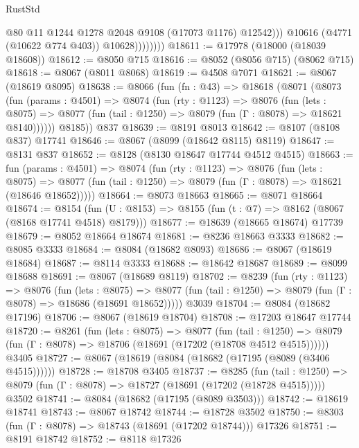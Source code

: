 \begin{lexlean}{RustStd}
\begin{coremodule}
                          @80
                          @11
                          @1244
                          @1278
                          @2048
                          @9108
                          (@17073 @1176)
                          @12542)))
                    @10616
                    (@4771 (@10622 @774 @403))
                    @10628))))))))
@18611 := @17978 (@18000 (@18039 @18608))
@18612 := @8050 @715
@18616 := @8052 (@8056 @715) (@8062 @715)
@18618 := @8067 (@8011 @8068)
@18619 := @4508 @7071
@18621 := @8067 (@18619 @8095)
@18638 := @8066
    (fun (fn : @43) =>
    @18618
      (@8071
        (@8073
          (fun (params : @4501) =>
          @8074
            (fun (rty : @1123) =>
            @8076
              (fun (lets : @8075) =>
              @8077 (fun (tail : @1250) => @8079 (fun (Γ : @8078) => @18621 @8140))))))
        @8185))
    @837
@18639 := @8191 @8013
@18642 := @8107 (@8108 @837) @17741
@18646 := @8067 (@8099 (@18642 @8115) @8119)
@18647 := @8131 @837
@18652 := @8128 (@8130 @18647 @17744 @4512 @4515)
@18663 := fun (params : @4501) =>
  @8074
    (fun (rty : @1123) =>
    @8076
      (fun (lets : @8075) =>
      @8077 (fun (tail : @1250) => @8079 (fun (Γ : @8078) => @18621 (@18646 @18652)))))
@18664 := @8073 @18663
@18665 := @8071 @18664
@18674 := @8154
    (fun (U : @8153) => @8155 (fun (t : @7) => @8162 (@8067 (@8168 @17741 @4518) @8179)))
@18677 := @18639 (@18665 @18674) @17739
@18679 := @8052 @18664 @18674
@18681 := @8236 @18663 @3333
@18682 := @8085 @3333
@18684 := @8084 (@18682 @8093)
@18686 := @8067 (@18619 @18684)
@18687 := @8114 @3333
@18688 := @18642 @18687
@18689 := @8099 @18688
@18691 := @8067 (@18689 @8119)
@18702 := @8239
    (fun (rty : @1123) =>
    @8076
      (fun (lets : @8075) =>
      @8077 (fun (tail : @1250) => @8079 (fun (Γ : @8078) => @18686 (@18691 @18652)))))
    @3039
@18704 := @8084 (@18682 @17196)
@18706 := @8067 (@18619 @18704)
@18708 := @17203 @18647 @17744
@18720 := @8261
    (fun (lets : @8075) =>
    @8077
      (fun (tail : @1250) =>
      @8079 (fun (Γ : @8078) => @18706 (@18691 (@17202 (@18708 @4512 @4515))))))
    @3405
@18727 := @8067 (@18619 (@8084 (@18682 (@17195 (@8089 (@3406 @4515))))))
@18728 := @18708 @3405
@18737 := @8285
    (fun (tail : @1250) => @8079 (fun (Γ : @8078) => @18727 (@18691 (@17202 (@18728 @4515)))))
    @3502
@18741 := @8084 (@18682 (@17195 (@8089 @3503)))
@18742 := @18619 @18741
@18743 := @8067 @18742
@18744 := @18728 @3502
@18750 := @8303 (fun (Γ : @8078) => @18743 (@18691 (@17202 @18744))) @17326
@18751 := @8191 @18742
@18752 := @8118 @17326

\end{coremodule}
\end{lexlean}
